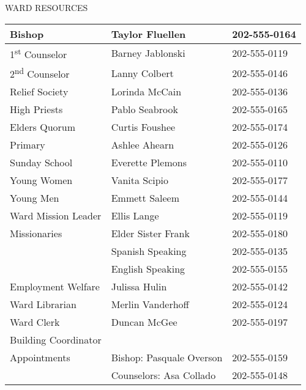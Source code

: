\documentclass[11pt,twocolumn]{memoir}
\renewcommand\&{{\textnormal{\fontspec{Minion Pro}\itshape\amp}}}
\begin{document}
{\noindent\large\MakeUppercase{Ward Resources}}
\begin{center}
\renewcommand{\tabcolsep}{0.1in}
\vspace{-1em}
\noindent\begin{tabular}{>{\footnotesize}l >{\footnotesize}l >{\footnotesize}l}
    Bishop\hspace{8em}              & Taylor Fluellen\hspace{8em}   & 202-555-0164  \\
    \hline
    1\textsuperscript{st} Counselor & Barney Jablonski              & 202-555-0119 \\
    \hline
    2\textsuperscript{nd} Counselor & Lanny Colbert                 & 202-555-0146 \\
    \hline
    Relief Society                  & Lorinda McCain                & 202-555-0136 \\
    \hline
    High Priests                    & Pablo Seabrook                & 202-555-0165 \\
    \hline
    Elders Quorum                   & Curtis Foushee                & 202-555-0174 \\
    \hline
    Primary                         & Ashlee Ahearn                 & 202-555-0126 \\
    \hline
    Sunday School                   & Everette Plemons              & 202-555-0110 \\
    \hline
    Young Women                     & Vanita Scipio                 & 202-555-0177 \\
    \hline
    Young Men                       & Emmett Saleem                 & 202-555-0144 \\
    \hline
    Ward Mission Leader             & Ellis Lange                   & 202-555-0119 \\
    \hline
    Missionaries                    & Elder \& Sister Frank         & 202-555-0180 \\
                                    & Spanish Speaking              & 202-555-0135 \\
                                    & English Speaking              & 202-555-0155 \\
    \hline
    Employment \& Welfare           & Julissa Hulin                 & 202-555-0142 \\
    \hline
    Ward Librarian                  & Merlin Vanderhoff             & 202-555-0124 \\
    \hline
    Ward Clerk                      & Duncan McGee                  & 202-555-0197 \\
    \hline
    Building Coordinator            & \multicolumn{2}{l}{\footnotesize{Lorinda Jones: lorinda@email.com}}\\
    \hline
    Appointments                    & Bishop: Pasquale Overson     & 202-555-0159 \\
                                    & Counselors: Asa Collado      & 202-555-0148 \\
\end{tabular}
\end{center}
\pagebreak
\end{document}
